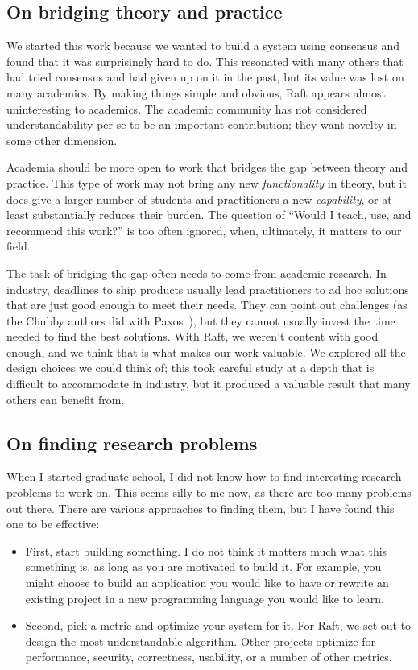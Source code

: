 \subsection{On bridging theory and practice}

We started this work because we wanted to build a system using consensus
and found that it was surprisingly hard to do. This resonated with many
others that had tried consensus and had given up on it in the past, but
its value was lost on many academics. By making things simple and
obvious, Raft appears almost uninteresting to academics. The academic
community has not considered understandability per se to be an important
contribution; they want novelty in some other dimension.

Academia should be more open to work that bridges the gap between theory
and practice. This type of work may not bring any new
\emph{functionality} in theory, but it does give a larger number of
students and practitioners a new \emph{capability}, or at least
substantially reduces their burden. The question of ``Would I teach,
use, and recommend this work?'' is too often ignored, when, ultimately,
it matters to our field.


The task of bridging the gap often needs to come from academic research.
In industry, deadlines to ship products usually lead practitioners to ad
hoc solutions that are just good enough to meet their needs. They can
point out challenges (as the Chubby authors did with Paxos~\cite{Chandra:2007}), but they cannot
usually invest the time needed to find the best solutions. With Raft, we
weren't content with good enough, and we think that is what makes our
work valuable. We explored all the design choices we could think of;
this took careful study at a depth that is difficult to accommodate in
industry, but it produced a valuable result that many others can benefit
from.

\subsection{On finding research problems}

When I started graduate school, I did not know how to find interesting
research problems to work on. This seems silly to me now, as there are
too many problems out there. There are various approaches to finding
them, but I have found this one to be effective:
%
\begin{itemize}
%
\item First, start building something. I do not think it matters much
what this something is, as long as you are motivated to build it. For
example, you might choose to build an application you would like to have
or rewrite an existing project in a new programming language you would
like to learn.
%
\item Second, pick a metric and optimize your system for it. For Raft,
we set out to design the most understandable algorithm. Other projects
optimize for performance, security, correctness, usability, or a number
of other metrics.
%
\end{itemize}

